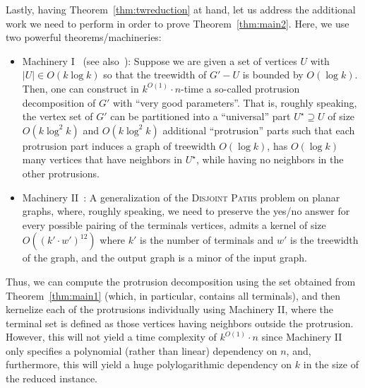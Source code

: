 \documentclass{article}
\numberwithin{claimcounter}{lemma}
\newcommand{\dispaths}{\textsc{Disjoint Paths}\xspace}
\begin{document}
Lastly, having Theorem~\ref{thm:twreduction} at hand, let us address the additional work we need to perform in order to prove Theorem~\ref{thm:main2}. Here, we use two powerful theorems/machineries:
\begin{itemize}
\item Machinery I~\cite{bodlaender2016meta} (see also~\cite{kernelbook}): Suppose we are given a set of vertices $U$ with $|U|\in O(k\log k)$ so that the treewidth of $G'-U$ is bounded by $O(\log k)$. Then, one can construct in $k^{O(1)}\cdot n$-time a so-called protrusion decomposition of $G'$ with ``very good parameters''. That is, roughly speaking, the vertex set of $G'$ can be partitioned into a ``universal'' part $U^\star\supseteq U$ of size $O(k\log^2 k)$ and $O(k\log^2 k)$ additional ``protrusion'' parts such that each protrusion part induces a graph of treewidth $O(\log k)$, has  $O(\log k)$ many vertices that have neighbors in $U^\star$, while having no neighbors in the other protrusions.
\item Machinery II~\cite{DBLP:conf/focs/0001Z23}:  A generalization of the \dispaths problem on planar graphs, where, roughly speaking, we need to preserve the yes/no answer for every possible pairing of the terminals vertices, admits a kernel of size $O((k'\cdot w')^{12})$ where $k'$ is the number of terminals and $w'$ is the treewidth of the graph, and the output graph is a minor of the input graph.
\end{itemize}

Thus, we can compute the protrusion decomposition using the set obtained from Theorem~\ref{thm:main1} (which, in particular, contains all terminals), and then kernelize each of the protrusions individually using Machinery II, where the terminal set is defined as those vertices having neighbors outside the protrusion. However, this will not yield a time complexity of $k^{O(1)}\cdot n$ since Machinery II only specifies a polynomial (rather than linear) dependency on $n$, and, furthermore, this will yield a huge polylogarithmic dependency on $k$ in the size of the reduced instance.
\end{document}
